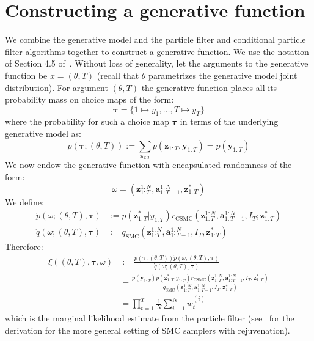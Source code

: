 \documentclass[11pt]{article}
\newcommand{\z}{\mathbf{z}}
\newcommand{\abold}{\mathbf{a}}
\newcommand{\y}{\mathbf{y}}
\newcommand\tdict[0]{\boldsymbol{\tau}}
\begin{document}
\section{Constructing a generative function}
We combine the generative model and the particle filter and conditional particle filter algorithms together to construct a generative function.
We use the notation of Section 4.5 of~\citet{cusumano-towner-thesis}.
Without loss of generality, let the arguments to the generative function be $x = (\theta, T)$ (recall that $\theta$ parametrizes the generative model joint distribution).
For argument $(\theta, T)$ the generative function places all its probability mass on choice maps of the form:
\[
\tdict = \{1 \mapsto y_1, \ldots, T \mapsto y_T\}
\]
where the probability for such a choice map $\tdict$ in terms of the underlying generative model as:
\[
    p(\tdict; (\theta, T)) := \sum_{\z_{1:T}} p(\z_{1:T}, \y_{1:T}) = p(\y_{1:T})
\]
We now endow the generative function with encapsulated randomness of the form:
\[
\omega = (\z_{1:T}^{1:N}, \abold_{1:T-1}^{1:N}, \z_{1:T}^*)
\]
We define:
\begin{align*}
\mathring{p}(\omega; (\theta, T), \tdict) &:= p(\z_{1:T}^* | y_{1:T}) r_{\mathrm{CSMC}}(\z_{1:T}^{1:N}, \abold_{1:T-1}^{1:N}, I_T; \z_{1:T}^*)\\
\mathring{q}(\omega; (\theta, T), \tdict) &:= q_{\mathrm{SMC}}(\z_{1:T}^{1:N}, \abold_{1:T-1}^{1:N}, I_T, \z_{1:T}^*)
\end{align*}
Therefore:
\begin{align*}
\xi((\theta, T), \tdict, \omega)
    &:= \frac{p(\tdict; (\theta, T)) \mathring{p}(\omega; (\theta, T), \tdict)}{\mathring{q}(\omega; (\theta, T), \tdict)}\\
    &= \frac{p(\y_{1:T}) p(\z_{1:T}^* | y_{1:T}) r_{\mathrm{CSMC}}(\z_{1:T}^{1:N}, \abold_{1:T-1}^{1:N}, I_T; \z_{1:T}^*)}{q_{\mathrm{SMC}}(\z_{1:T}^{1:N}, \abold_{1:T-1}^{1:N}, I_T, \z_{1:T}^*)}\\
    &= \prod_{t=1}^T \frac{1}{N} \sum_{i-1}^N w^{(i)}_t
\end{align*}
which is the marginal likelihood estimate from the particle filter (see~\citet{cusumano2017aide} for the derivation for the more general setting of SMC samplers with rejuvenation).
\end{document}
